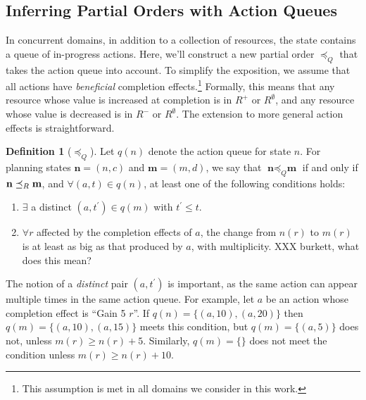 \documentclass[letterpaper]{article}
\theoremstyle{plain} \newtheorem{theorem}{Theorem} \newtheorem{proposition}{Proposition} \newtheorem{lemma}{Lemma}
\theoremstyle{definition} \newtheorem{definition}{Definition} \newtheorem{conjecture}{Conjecture} \newtheorem*{example}{Example}
\theoremstyle{remark} \newtheorem*{remark}{Remark} \newtheorem*{note}{Note} \newtheorem{case}{Case}
\begin{document}
\subsection{Inferring Partial Orders with Action Queues}

\newcommand{\poq}{\preceq_Q}

In concurrent domains, in addition to a collection of resources, the state contains a queue
of in-progress actions. Here, we'll construct a new partial order $\poq$ that takes the
action queue into account. To simplify the exposition, we assume that all
actions have \emph{beneficial} completion effects.\footnote{This assumption is met in all
domains we consider in this work.} Formally, this means that any resource whose value is
increased at completion is in $R^+$ or $R^\emptyset$, and any resource whose value is decreased is in
$R^-$ or $R^\emptyset$. The extension to more general action effects is straightforward.
\begin{definition}[$\poq$]
	\label{def-poq}
	Let $q(n)$ denote the action queue for state $n$. For planning states $\textbf{n} = (n, c)$ and $\textbf{m} = (m, d)$, we say that $\textbf{n} \poq \textbf{m}$ if and only if $\textbf{n} \preceq_R \textbf{m}$, and $\forall (a, t) \in q(n)$, at least one of the following conditions holds:
	\begin{enumerate}
		\item $\exists$ a distinct $ (a, t^\prime) \in q(m)$ with $t^\prime \le t$.
		\item $\forall r $ affected by the completion effects of $ a$, the change from $n(r)$ to $m(r)$ is at least as big as that produced by $a$, with multiplicity. XXX burkett, what does this mean?
	\end{enumerate}
\end{definition}
The notion of a \emph{distinct} pair $(a, t^\prime)$ is important, as the same action can appear multiple times in the same action queue. For example, let $a$ be an action whose completion effect is ``Gain 5 $r$''. If $q(n) = \{(a, 10), (a, 20)\}$ then $q(m) = \{(a, 10),
(a, 15)\}$ meets this condition, but $q(m) = \{(a, 5)\}$ does not, unless $m(r) \ge n(r) + 5$. Similarly, $q(m) = \{\}$ does not meet the condition unless $m(r) \ge n(r) + 10$.
\end{document}
